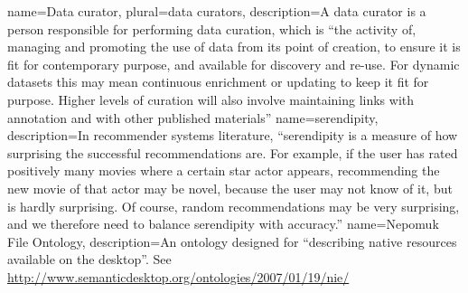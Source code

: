 {
  name=Data curator,
  plural=data curators,
  description={A data curator is a person responsible for performing data curation, which is ``the activity of, managing and promoting the use of data from its point of creation, to ensure it is fit for contemporary purpose, and available for discovery and re-use. For dynamic datasets this may mean continuous enrichment or updating to keep it fit for purpose. Higher levels of curation will also involve maintaining links with annotation and with other published materials''\cite{Lord2003}
  }
}
{
  name=serendipity,
  description={In recommender systems literature, ``serendipity is a measure of how surprising the successful recommendations are. For example, if the user has rated positively many movies where a certain star actor appears, recommending the new movie of that actor may be novel, because the user may not know of it, but is hardly surprising. Of course, random recommendations may be very surprising, and we therefore need to balance serendipity with accuracy.''\cite{Shani2011}
  }
}
{
  name=Nepomuk File Ontology,
  description={An ontology designed for ``describing native resources available on the desktop''. See \url{http://www.semanticdesktop.org/ontologies/2007/01/19/nie/}
  }
}